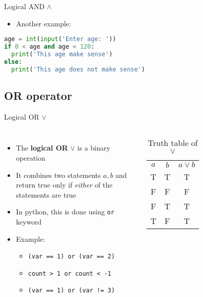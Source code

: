 \documentclass[10pt,xcolor={table,dvipsnames},t]{beamer}
\begin{document}
\begin{frame}[fragile]{Logical AND $\land$}
  \begin{itemize}
    \item Another example:
  \end{itemize}
\begin{lstlisting}[language=python]
age = int(input('Enter age: '))
if 0 < age and age < 120:
  print('This age make sense')
else:
  print('This age does not make sense')
\end{lstlisting}
\end{frame}


\subsection{OR operator}
\begin{frame}{Logical OR $\lor$}
  \begin{columns}
    \begin{itemize}
      \item The \textbf{logical OR} $\lor$ is a binary operation
      \item It combines two statements $a,b$ and return true only if \textit{either} of the statements are true 
      \item In python, this is done using \texttt{or} keyword
      \item Example:
      \begin{itemize}
        \item \texttt{(var == 1) or (var == 2)}
        \item \texttt{count > 1 or count < -1}
        \item \texttt{(var == 1) or (var != 3)}
      \end{itemize}
    \end{itemize}
    \begin{table}[]
      \begin{tabular}{ccc}
      $a$ & $b$ & $a\lor b$  \\
      T & T & T \\
      F & F & F \\
      F & T & T\\
      T & F & T
      \end{tabular}
      \caption{Truth table of $\lor$}
      \end{table}
  \end{columns}
\end{frame}
\end{document}
